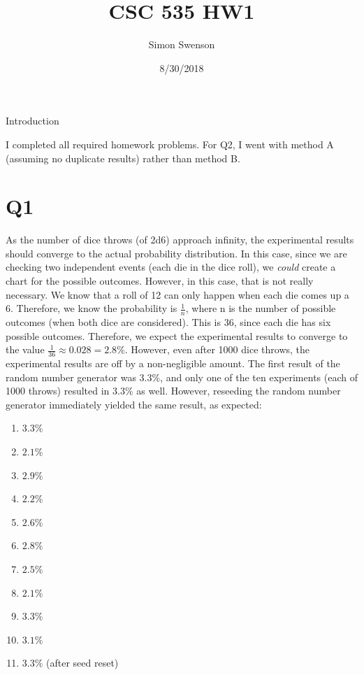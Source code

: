 \documentclass{article}
\title{CSC 535 HW1}
\date{8/30/2018}
\author{Simon Swenson}
\begin{document}
\maketitle
{}

\large Introduction

\small I completed all required homework problems. For Q2, I went with method A 
(assuming no duplicate results) rather than method B.

\section{Q1}

As the number of dice throws (of 2d6) approach infinity, the experimental 
results should converge to the actual probability distribution. In this case, 
since we are checking two independent events (each die in the dice roll), we
\textit{could} create a chart for the possible outcomes. However, in this case, 
that is not really necessary. We know that a roll of 12 can only happen when 
each die comes up a 6. Therefore, we know the probability is $\frac{1}{n}$, 
where n is the number of possible outcomes (when both dice are considered). 
This is 36, since each die has six possible outcomes. Therefore, we expect the experimental 
results to converge to the value $\frac{1}{36} \approx 0.028 = 2.8 \%$. 
However, even after 1000 dice throws, the experimental results are off by a 
non-negligible amount. The first result of the random number generator was 
$3.3\%$, and only one of the ten experiments (each of 1000 throws) resulted in 
$3.3\%$ as well. However, reseeding the random number generator immediately 
yielded the same result, as expected:

\begin{enumerate}
    \item $3.3\%$
    \item $2.1\%$
    \item $2.9\%$
    \item $2.2\%$
    \item $2.6\%$
    \item $2.8\%$
    \item $2.5\%$
    \item $2.1\%$
    \item $3.3\%$
    \item $3.1\%$
    \item $3.3\%$ (after seed reset)
\end{enumerate}
\end{document}

